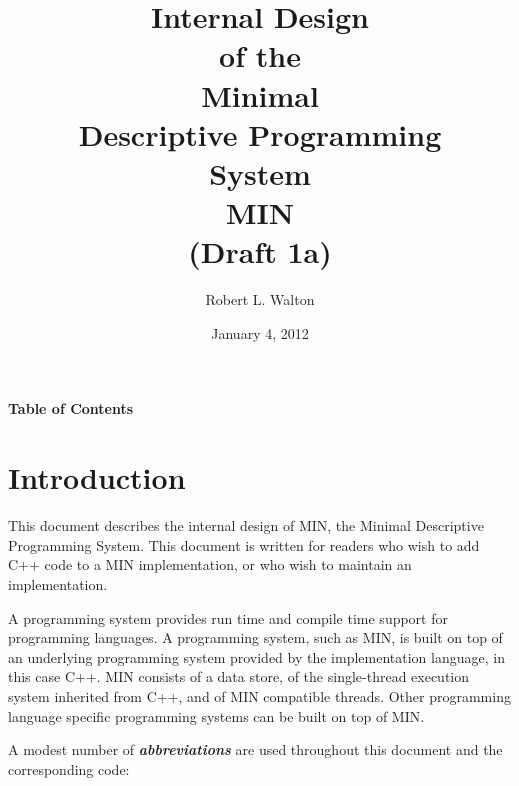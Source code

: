\documentclass[12pt]{article}
\makeatletter
\renewcommand\tableofcontents{%
    \begin{list}{}%
	     {\setlength{\itemsep}{0in}%
	      \setlength{\topsep}{0in}%
	      \setlength{\parsep}{1ex}%
	      \setlength{\labelwidth}{0in}%
	      \setlength{\baselineskip}{1.5ex}%
	      \setlength{\leftmargin}{0.8in}%
	      \setlength{\rightmargin}{0.8in}}%
    \item\@starttoc{toc}%
    \end{list}}
\newcommand{\skey}[2]{{\bf \em #1#2}\index{#1}}
\makeatother
\begin{document}
        
\title{Internal Design\\[2ex]of the\\[2ex]
       Minimal\\Descriptive Programming\\System\\[2ex]MIN\\[2ex]
       (Draft 1a)}

\author{Robert L. Walton}

\date{January 4, 2012}
 
\maketitle

\newpage
\begin{center}
\large \bf Table of Contents
\end{center}

\bigskip

\tableofcontents 

\newpage

\section{Introduction}

This document describes the internal design of MIN,
the Minimal Descriptive Programming System.
This document is written for readers who wish to add C++ code
to a MIN implementation, or who wish to maintain an implementation.

A programming system provides run time and compile time support
for programming languages.
A programming system, such as MIN, is
built on top of an underlying programming system provided by the
implementation language, in this case C++.
MIN consists of a data store, of the single-thread execution system
inherited from C++, and of MIN compatible threads.
Other programming language specific
programming systems can be built on top of MIN.

A modest number of \skey{abbreviation}s are used throughout this document
and the corresponding code:
\end{document}
